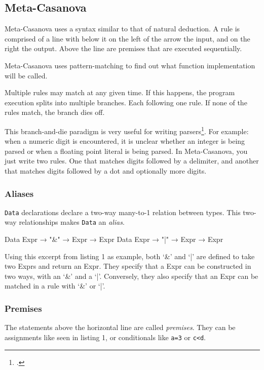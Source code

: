 \subsection{Meta-Casanova}
\begin{multicols}{2}\noindent
  Meta-Casanova uses a syntax similar to that of natural deduction.
  A rule is comprised of a line with below it on the left of the arrow the input, and on the right the output.
  Above the line are premises that are executed sequentially.

  Meta-Casanova uses pattern-matching to find out what function implementation will be called.

  Multiple rules may match at any given time.
  If this happens, the program execution splits into multiple branches.
  Each following one rule.
  If none of the rules match, the branch dies off. 
  
  This branch-and-die paradigm is very useful for writing parsers\footcite{TODO:source}.
  For example: when a numeric digit is encountered,
  it is unclear whether an integer is being parsed or when a floating point literal is being parsed. 
  In Meta-Casanova, you just write two rules.
  One that matches digits followed by a delimiter,
  and another that matches digits followed by a dot and optionally more digits.

  \subsubsection*{Aliases}
  \texttt{Data} declarations declare a two-way \mbox{many-to-1} relation between types.
  This two-way relationships makes \texttt{Data} an \textit{alias}.

  \begin{code}
  Data Expr → "&" → Expr → Expr
  Data Expr → "|" → Expr → Expr
  \end{code}

  Using this excerpt from listing 1 as example, both `\&' and `|' are defined to take two Exprs and return an Expr.
  They specify that a Expr can be constructed in two ways, with an `\&' and a `|'.
  Conversely, they also specify that an Expr can be matched in a rule with `\&' or `|'. 

  \subsubsection*{Premises}
  The statements above the horizontal line are called \textit{premises}.
  They can be assignments like seen in listing 1, or conditionals like \verb|a=3| or \verb|c<d|.


\end{multicols}
